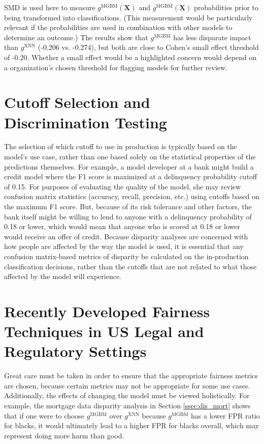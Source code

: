\documentclass[information,article,submit,moreauthors,pdftex]{definitions/mdpi}
\begin{document}
\noindent SMD is used here to measure $g^\text{MGBM}(\mathbf{X})$ and $g^\text{MGBM}(\mathbf{X})$ probabilities prior to being transformed into classifications.  (This measurement would be particularly relevant if the probabilities are used in combination with other models to determine an outcome.)  The results show that $g^\text{MGBM}$ has less disparate impact than $g^\text{XNN}$ (-0.206 vs. -0.274), but both are close to Cohen’s small effect threshold of -0.20. Whether a small effect would be a highlighted concern would depend on a organization’s chosen threshold for flagging models for further review. 

\section{Cutoff Selection and Discrimination Testing}\label{a_sec:cut}

The selection of which cutoff to use in production is typically based on the model’s use case, rather than one based solely on the statistical properties of the predictions themselves.  For example, a model developer at a bank might build a credit model where the F1 score is maximized at a delinquency probability cutoff of 0.15.  For purposes of evaluating the quality of the model, she may review confusion matrix statistics (accuracy, recall, precision, etc.) using cutoffs based on the maximum F1 score. But, because of its risk tolerance and other factors, the bank itself might be willing to lend to anyone with a delinquency probability of 0.18 or lower, which would mean that anyone who is scored at 0.18 or lower would receive an offer of credit.  Because disparity analyses are concerned with how people are affected by the way the model is used, it is essential that any confusion matrix-based metrics of disparity be calculated on the in-production classification decisions, rather than the cutoffs that are not related to what those affected by the model will experience.

\section{Recently Developed Fairness Techniques in US Legal and Regulatory Settings}\label{a_sec:comp}

Great care must be taken in order to ensure that the appropriate fairness metrics are chosen, because certain metrics may not be appropriate for some use cases. Additionally, the effects of changing the model must be viewed holistically.  For example, the mortgage data disparity analysis in Section \ref{ssec:dis_mort} shows that if one were to choose $g^\text{MGBM}$ over $g^\text{XNN}$ because $g^\text{MGBM}$ has a lower FPR ratio for blacks, it would ultimately lead to a higher FPR for blacks overall, which may represent doing more harm than good.
\end{document}
